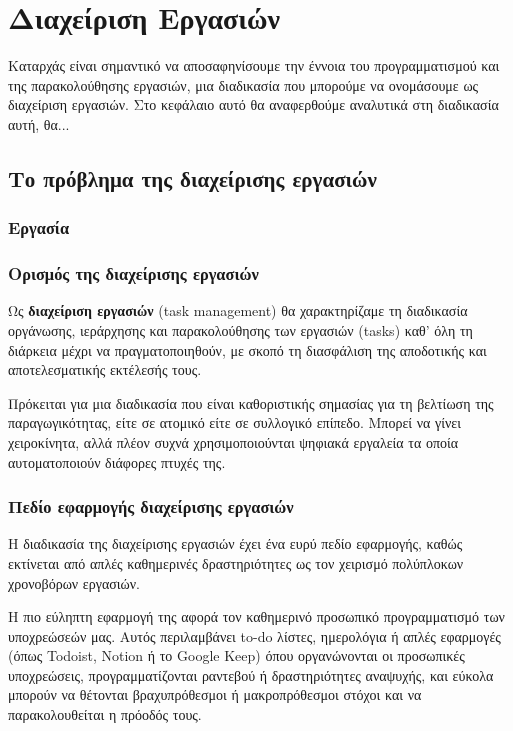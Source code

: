 \chapter{Διαχείριση Εργασιών}
    Καταρχάς είναι σημαντικό να αποσαφηνίσουμε την έννοια του προγραμματισμού και της παρακολούθησης εργασιών, μια διαδικασία που μπορούμε να ονομάσουμε ως διαχείριση εργασιών. Στο κεφάλαιο αυτό θα αναφερθούμε αναλυτικά στη διαδικασία αυτή, θα...
    
    \section{Το πρόβλημα της διαχείρισης εργασιών}

        \subsection{Εργασία}
    
        \subsection{Ορισμός της διαχείρισης εργασιών}
            Ως \textbf{διαχείριση εργασιών} (task management) θα χαρακτηρίζαμε τη διαδικασία οργάνωσης, ιεράρχησης και παρακολούθησης των εργασιών (tasks) καθ' όλη τη διάρκεια μέχρι να πραγματοποιηθούν, με σκοπό τη διασφάλιση της αποδοτικής και αποτελεσματικής εκτέλεσής τους.
            
            Πρόκειται για μια διαδικασία που είναι καθοριστικής σημασίας για τη βελτίωση της παραγωγικότητας, είτε σε ατομικό είτε σε συλλογικό επίπεδο. Μπορεί να γίνει χειροκίνητα, αλλά πλέον συχνά χρησιμοποιούνται ψηφιακά εργαλεία τα οποία αυτοματοποιούν διάφορες πτυχές της.
        
        \subsection{Πεδίο εφαρμογής διαχείρισης εργασιών}
            Η διαδικασία της διαχείρισης εργασιών έχει ένα ευρύ πεδίο εφαρμογής, καθώς εκτίνεται από απλές καθημερινές δραστηριότητες ως τον χειρισμό πολύπλοκων χρονοβόρων εργασιών.

            Η πιο εύληπτη εφαρμογή της αφορά τον καθημερινό προσωπικό προγραμματισμό των υποχρεώσεών μας. Αυτός περιλαμβάνει to-do λίστες, ημερολόγια ή απλές εφαρμογές (όπως Todoist, Notion ή το Google Keep) όπου οργανώνονται οι προσωπικές υποχρεώσεις, προγραμματίζονται ραντεβού ή δραστηριότητες αναψυχής, και εύκολα μπορούν να θέτονται βραχυπρόθεσμοι ή μακροπρόθεσμοι στόχοι και να παρακολουθείται η πρόοδός τους. \cite{Todoist} \cite{Notion}

